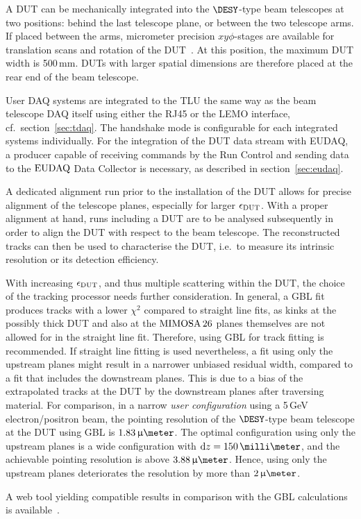 A DUT can be mechanically integrated into the $\DESY$-type beam telescopes at two positions: behind the last telescope plane, or between the two telescope arms.
If placed between the arms, micrometer precision $xy\phi$-stages are available for translation scans and rotation of the DUT~\cite{Mimosa-twiki}.
At this position, the maximum DUT width is 500\,mm.
DUTs with larger spatial dimensions are therefore placed at the rear end of the beam telescope. 

User DAQ systems are integrated to the TLU the same way as the beam telescope DAQ itself using either the RJ45 or the LEMO interface, cf.~section~\ref{sec:tdaq}.
The handshake mode is configurable for each integrated systems individually. 
For the integration of the DUT data stream with EUDAQ, a producer capable of receiving commands by the Run Control and sending data to the $\textrm{EUDAQ}$ Data Collector is necessary,
 as described in section~\ref{sec:eudaq}.

A dedicated alignment run prior to the installation of the DUT allows for precise alignment of the telescope planes, especially for larger $\mathnormal{\epsilon_{\textrm{DUT}}}$. 
With a proper alignment at hand, runs including a DUT are to be analysed subsequently in order to align the DUT with respect to the beam telescope. 
The reconstructed tracks can then be used to characterise the DUT, i.e.~to measure its intrinsic resolution or its detection efficiency. 

With increasing $\mathnormal{\epsilon_{\textrm{DUT}}}$, and thus multiple scattering within the DUT, the choice of the tracking processor needs further consideration. 
In general, a GBL fit produces tracks with a lower $\chi^2$ compared to straight line fits,
 as kinks at the possibly thick DUT and also at the $\textrm{MIMOSA\,26}$ planes themselves are not allowed for in the straight line fit.
Therefore, using GBL for track fitting is recommended. 
If straight line fitting is used nevertheless, a fit using only the upstream planes might result in a narrower unbiased residual width, compared to a fit that includes the downstream planes. 
This is due to a bias of the extrapolated tracks at the DUT by the downstream planes after traversing material. 
For comparison, in a narrow \textit{user configuration} using a 5\,GeV electron/positron beam, the pointing resolution of the $\DESY$-type beam telescope at the DUT using GBL is $1.83\,\upmu\meter$. 
The optimal configuration using only the upstream planes is a wide configuration with $\dz = 150\,\milli\meter$,
 and the achievable pointing resolution is above $3.88\,\upmu\meter$. 
Hence, using only the upstream planes deteriorates the resolution by more than $2\,\upmu\meter$.

A web tool yielding compatible results in comparison with the GBL calculations is available~\cite{webtool}.